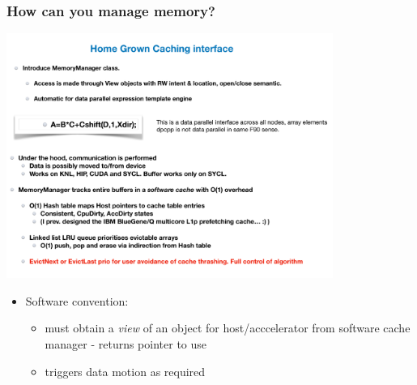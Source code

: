 \documentclass[pdf,ps,8pt]{beamer}
\begin{document}
\begin{frame}[fragile]\small\frametitle{ How can you manage memory?}
  \includegraphics[width=0.8\textwidth]{Caching.pdf}

  \begin{center}
    \begin{itemize}
    \item  Software convention:
    \begin{itemize}
    \item must obtain a \emph{view} of an object for host/acccelerator from software cache manager - returns pointer to use
    \item triggers data motion as required
    \end{itemize}
    \end{itemize}
  \end{center}
\end{frame}
\end{document}
